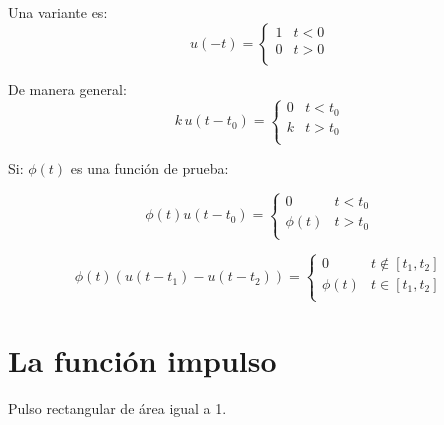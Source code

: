 Una variante es:
\begin{equation*}
    u(-t)=\begin{cases}
        1&t<0\\
        0&t>0\\
    \end{cases}
\end{equation*}
\begin{figure}[H]
    \centering
    
\end{figure}

De manera general:
\begin{equation}
    k\,u(t-t_0)=\begin{cases}
        0&t<t_0\\
        k&t>t_0\\
    \end{cases}
\end{equation}
\begin{figure}[H]
    \centering
    
\end{figure}

Si: $\phi(t)$ es una función de prueba:
\begin{figure}[H]
    \centering
    
\end{figure}
\begin{equation}
    \phi(t)u(t-t_0)=\begin{cases}
        0&t<t_0\\
        \phi(t)&t>t_0\\
    \end{cases}
\end{equation}
\begin{figure}[H]
    \centering
    
\end{figure}
\begin{equation*}
    \phi(t)(u(t-t_1)-u(t-t_2))=\begin{cases}
        0&t\notin[t_1,t_2]\\
        \phi(t)&t\in[t_1,t_2]\\
    \end{cases}
\end{equation*}
\begin{figure}[H]
    \centering
    
\end{figure}

\section{La función impulso}
Pulso rectangular de área igual a 1.
\begin{figure}[H]
    \centering
    
\end{figure}

